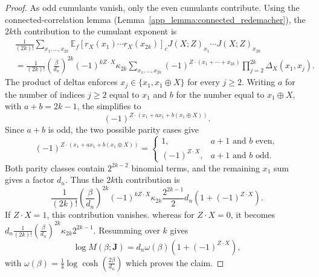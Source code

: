 \documentclass[aps,pra,superscriptaddress,twocolumn,longbibliography]{revtex4-2}
\begin{document}
\begin{proof}
As odd cumulants vanish, only the even cumulants contribute. Using
the connected-correlation lemma (Lemma~\ref{app_lemma:connected_redemacher}), the $2k$th contribution to
the cumulant exponent is
\begin{align}
    &\frac{1}{(2k)!}
    \sum_{x_1,\dots,x_{2k}}
    \mathbb{E}_{f}
    [r_X(x_1)\cdots r_X(x_{2k})]_{c}
    J(X;Z)_{x_1}\cdots J(X;Z)_{x_{2k}}
    \nonumber\\
    &=
    \frac{1}{(2k)!}
    \left(\frac{\beta}{d_n}\right)^{2k}
    (-1)^{k Z\cdot X}\kappa_{2k}
    \sum_{x_1,\dots,x_{2k}}
    (-1)^{Z\cdot(x_1+\cdots+x_{2k})}
    \prod_{j=2}^{2k}\Delta_X(x_1,x_j).
\end{align}
The product of deltas enforces
$x_j\in\{x_1,x_1\oplus X\}$ for every $j\geq2$. Writing $a$ for the
number of indices $j\geq2$ equal to $x_1$ and $b$ for the number equal
to $x_1\oplus X$, with $a+b=2k-1$, the simplifies to
%
\begin{equation}
    (-1)^{Z\cdot(x_1+a x_1+b(x_1\oplus X))}.
\end{equation}
%
Since $a+b$ is odd, the two possible parity cases give
%
\begin{equation}
    (-1)^{Z\cdot(x_1+a x_1+b(x_1\oplus X))}
    =
    \begin{cases}
    1, & a+1 \text{ and } b \text{ even},\\
    (-1)^{Z\cdot X}, & a+1 \text{ and } b \text{ odd}.
    \end{cases}
\end{equation}
%
Both parity classes contain $2^{2k-2}$ binomial terms, and the remaining
$x_1$ sum gives a factor $d_n$. Thus the $2k$th contribution is
%
\begin{equation}
    \frac{1}{(2k)!}
    \left(\frac{\beta}{d_n}\right)^{2k}
    (-1)^{k Z\cdot X}\kappa_{2k}
    \frac{2^{2k-1}}{2}d_n(1+(-1)^{Z\cdot X}).
\end{equation}
%
If $Z\cdot X=1$, this contribution vanishes. whereas for $Z\cdot X=0$, it becomes $ d_n \frac{1}{(2k)!}\left(\frac{\beta}{d_n}\right)^{2k} \kappa_{2k}2^{2k-1}$. Resumming over $k$ gives
%
\begin{equation}
    \log M(\beta;\mathbf{J})
    =
    d_n\omega(\beta)(1+(-1)^{Z\cdot X}),
\end{equation}
%
with $\omega(\beta) =\frac{1}{4}\log\cosh\left(\frac{2\beta}{d_n}\right)$ which proves the claim. 
%
\end{proof}
\end{document}
